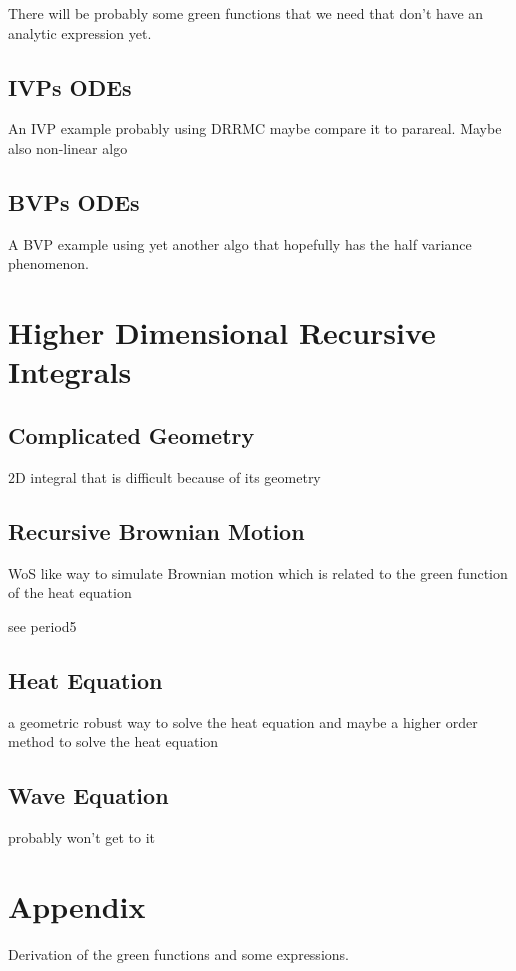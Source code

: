 \documentclass[a4paper,12pt]{article}
\begin{document}
\begin{example}
    There will be probably some green functions that we need
    that don't have an analytic expression yet.
\end{example}

\subsection{IVPs ODEs}
An IVP example probably using DRRMC maybe compare it to parareal. Maybe also non-linear algo

\subsection{BVPs ODEs}
A BVP example using yet another algo that hopefully has the half variance phenomenon.

\section{Higher Dimensional Recursive Integrals}
\subsection{Complicated Geometry}
\begin{example}
    $2$D integral that is difficult because of its geometry
\end{example}

\subsection{Recursive Brownian Motion}
WoS like way to simulate Brownian motion which is related to the green function
of the heat equation

\begin{example}
    see period5
\end{example}

\subsection{Heat Equation}
a geometric robust way to solve the heat equation and maybe a higher order method to solve
the heat equation

\subsection{Wave Equation}
probably won't get to it

\newpage
\printbibliography
\newpage

\section{Appendix}
Derivation of the green functions and some expressions.
\end{document}
